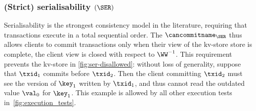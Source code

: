 
\subsubsection{(Strict) serialisability $(\SER)$}
Serialisability is the strongest consistency model in the literature, requiring that transactions execute in a  total sequential order. 
The $\cancommitname_{\SER}$ thus allows clients to commit transactions only when 
their view of the kv-store store is complete, \ie the client view is closed with respect to $\WW^{-1}$.
This requirement prevents the kv-store in  \cref{fig:ser-disallowed}: 
without loss of generality, suppose that $\txid_1$ commits before $\txid_2$. Then the client committing $\txid_2$ must see the version of $\key_1$ written by $\txid_1$, 
and thus cannot read the outdated value $\val_0$ for $\key_1$. 
This example is allowed by all other execution tests in~\cref{fig:execution_tests}.

